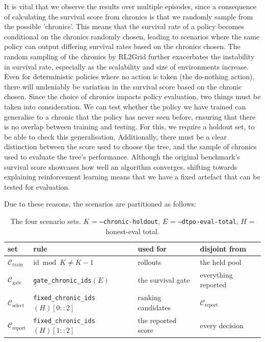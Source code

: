 It is vital that we observe the results over multiple episodes, since a consequence of calculating the survival score from chronics is that we randomly sample from the possible 'chronics'. This means that the survival rate of a policy becomes conditional on the chronics randomly chosen, leading to scenarios where the same policy can output differing survival rates based on the chronics chosen. The random sampling of the chronics by RL2Grid further exacerbates the instability in survival rate, especially as the scalability and size of environments increase. Even for deterministic policies where no action is taken (the do-nothing action), there will undeniably be variation in the survival score based on the chronic chosen. Since the choice of chronics impacts policy evaluation, two things must be taken into consideration. We can test whether the policy we have trained can generalise to a chronic that the policy has never seen before, ensuring that there is no overlap between training and testing. For this, we require a holdout set, to be able to check this generalisation. Additionally, there must be a clear distinction between the score used to choose the tree, and the sample of chronics used to evaluate the tree's performance. Although the original benchmark's survival score showcases how well an algorithm converges, shifting towards explaining reinforcement learning means that we have a fixed artefact that can be tested for evaluation.

Due to these reasons, the scenarios are partitioned as follows:

\begin{table}[H]
\centering\small
\begin{tabular}{llll}
\toprule
set & rule & used for & disjoint from \\
\midrule
$\mathcal{C}_{\text{train}}$  & $\mathrm{id} \bmod K \neq K-1$ & rollouts & the held pool \\
$\mathcal{C}_{\text{gate}}$   & \texttt{gate\_chronic\_ids}$(E)$ & the survival gate & everything reported \\
$\mathcal{C}_{\text{select}}$ & \texttt{fixed\_chronic\_ids}$(H)[0::2]$ & ranking candidates & $\mathcal{C}_{\text{report}}$ \\
$\mathcal{C}_{\text{report}}$ & \texttt{fixed\_chronic\_ids}$(H)[1::2]$ & the reported score & every decision \\
\bottomrule
\end{tabular}
\caption{The four scenario sets. $K$ = \texttt{--chronic-holdout}, $E$ =
\texttt{--dtpo-eval-total}, $H$ = honest-eval total.}
\label{tab:partition}
\end{table}

